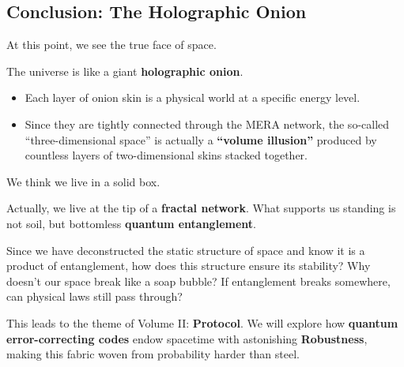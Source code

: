 \subsection{Conclusion: The Holographic Onion}

At this point, we see the true face of space.

The universe is like a giant \textbf{holographic onion}.

\begin{itemize}
\item Each layer of onion skin is a physical world at a specific energy level.

\item Since they are tightly connected through the MERA network, the so-called ``three-dimensional space'' is actually a \textbf{``volume illusion''} produced by countless layers of two-dimensional skins stacked together.
\end{itemize}

We think we live in a solid box.

Actually, we live at the tip of a \textbf{fractal network}. What supports us standing is not soil, but bottomless \textbf{quantum entanglement}.

Since we have deconstructed the static structure of space and know it is a product of entanglement, how does this structure ensure its stability? Why doesn't our space break like a soap bubble? If entanglement breaks somewhere, can physical laws still pass through?

This leads to the theme of Volume II: \textbf{Protocol}. We will explore how \textbf{quantum error-correcting codes} endow spacetime with astonishing \textbf{Robustness}, making this fabric woven from probability harder than steel.

